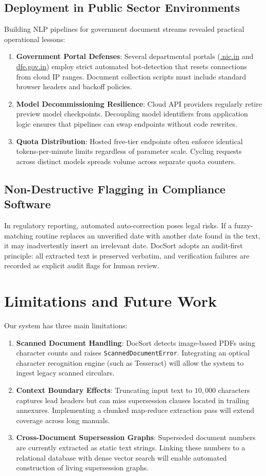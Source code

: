 \documentclass{article}
\begin{document}
\subsection{Deployment in Public Sector Environments}
Building NLP pipelines for government document streams revealed practical operational lessons:
\begin{enumerate}
    \item \textbf{Government Portal Defenses}: Several departmental portals (\url{.nic.in} and \url{dfe.gov.in}) employ strict automated bot-detection that resets connections from cloud IP ranges. Document collection scripts must include standard browser headers and backoff policies.
    \item \textbf{Model Decommissioning Resilience}: Cloud API providers regularly retire preview model checkpoints. Decoupling model identifiers from application logic ensures that pipelines can swap endpoints without code rewrites.
    \item \textbf{Quota Distribution}: Hosted free-tier endpoints often enforce identical tokens-per-minute limits regardless of parameter scale. Cycling requests across distinct models spreads volume across separate quota counters.
\end{enumerate}

\subsection{Non-Destructive Flagging in Compliance Software}
In regulatory reporting, automated auto-correction poses legal risks. If a fuzzy-matching routine replaces an unverified date with another date found in the text, it may inadvertently insert an irrelevant date. DocSort adopts an audit-first principle: all extracted text is preserved verbatim, and verification failures are recorded as explicit audit flags for human review.

\section{Limitations and Future Work}

Our system has three main limitations:
\begin{enumerate}
    \item \textbf{Scanned Document Handling}: DocSort detects image-based PDFs using character counts and raises \texttt{ScannedDocumentError}. Integrating an optical character recognition engine (such as Tesseract) will allow the system to ingest legacy scanned circulars.
    \item \textbf{Context Boundary Effects}: Truncating input text to $10{,}000$ characters captures lead headers but can miss supersession clauses located in trailing annexures. Implementing a chunked map-reduce extraction pass will extend coverage across long manuals.
    \item \textbf{Cross-Document Supersession Graphs}: Superseded document numbers are currently extracted as static text strings. Linking these numbers to a relational database with dense vector search will enable automated construction of living supersession graphs.
\end{enumerate}
\end{document}
